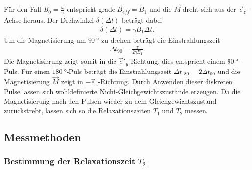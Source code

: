 \FloatBarrier
Für den Fall $B_0=\frac{\omega}{\gamma}$ entspricht grade $B_{eff}=B_1$
und die $\vec{M}$ dreht sich aus der $\vec{e}_z$-Achse heraus.
Der Drehwinkel $\delta(\Delta t)$ beträgt dabei
\begin{align}
  \delta(\Delta t)=\gamma B_1 \Delta t.
\end{align}
Um die Magnetisierung um $\SI{90}{\degree}$ zu drehen beträgt die
Einstrahlungszeit
\begin{align}
  \Delta t_{90} = \frac{\pi}{2\gamma B_1}.
\end{align}
Die Magnetisierung zeigt somit in die $\vec{e}'_y$-Richtung, dies
entspricht einem $\SI{90}{\degree}$-Puls.
Für einen $\SI{180}{\degree}$-Puls beträgt die Einstrahlungszeit
$\Delta t_{180}=2\Delta t_{90}$ und die Magnetisierung $\vec{M}$
zeigt in $-\vec{e}_z$-Richtung.
Durch Anwenden dieser diskreten Pulse lassen sich
wohldefinierte Nicht-Gleichgewichtszustände erzeugen.
Da die Magnetisierung nach den Pulsen wieder zu dem
Gleichgewichtszustand zurückstrebt, lassen sich so die
Relaxationszeiten $T_1$ und $T_2$ messen.

\subsection{Messmethoden}
\subsubsection{Bestimmung der Relaxationszeit $T_2$}
\label{subsubsec:T2mess}

